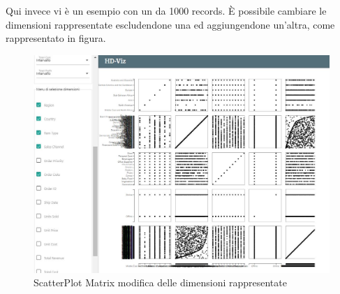 \documentclass[../manuale_utente.tex]{subfiles}
\begin{document}
Qui invece vi è un esempio con un  da 1000 records. È possibile cambiare le dimensioni rappresentate escludendone una ed aggiungendone un'altra, come rappresentato in figura.

\begin{figure}[H]
	\centering
	\includegraphics[width=18cm]{img/spm/spm_cambio_dim.jpg}
	\caption{ScatterPlot Matrix modifica delle dimensioni rappresentate}
\end{figure}
\end{document}
